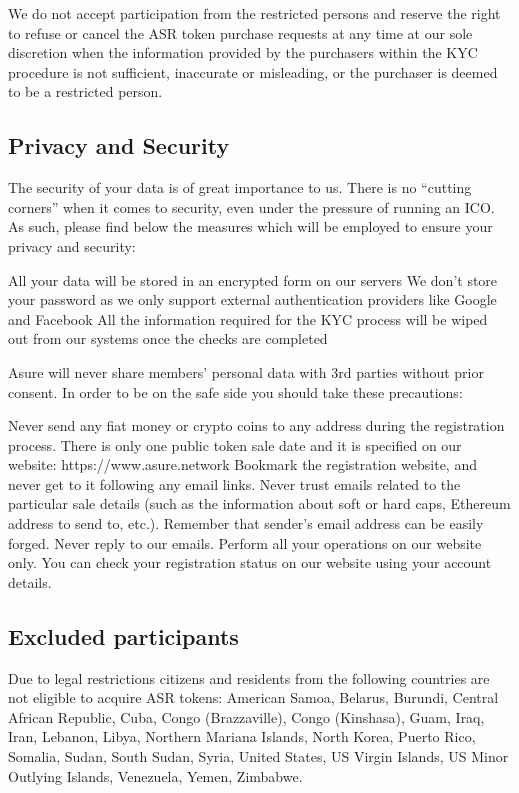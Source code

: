 We do not accept participation from the restricted persons and reserve the right to refuse or cancel the ASR token purchase requests at any time at our sole discretion when the information provided by the purchasers within the KYC procedure is not sufficient, inaccurate or misleading, or the purchaser is deemed to be a restricted person.

\subsection{Privacy and Security}
The security of your data is of great importance to us. There is no “cutting corners” when it comes to security, even under the pressure of running an ICO.  As such, please find below the measures which will be employed to ensure your privacy and security: 

All your data will be stored in an encrypted form on our servers
We don’t store your password as we only support external authentication providers like Google and Facebook
All the information required for the KYC process will be wiped out from our systems once the checks are completed

Asure will never share members’ personal data with 3rd parties without prior consent. In order to be on the safe side you should take these precautions: 

Never send any fiat money or crypto coins to any address during the registration process. There is only one public token sale date and it is specified on our 
website: https://www.asure.network
Bookmark the registration website, and never get to it following any email links.
Never trust emails related to the particular sale details (such as the information about soft or hard caps, Ethereum address to send to, etc.). Remember that sender’s email address can be easily forged. 
Never reply to our emails. Perform all your operations on our website only. You can check your registration status on our website using your account details. 


\subsection{Excluded participants}
Due to legal restrictions citizens and residents from the following countries are not eligible to acquire ASR tokens: American Samoa, Belarus, Burundi, Central African Republic, Cuba, Congo (Brazzaville), Congo (Kinshasa), Guam, Iraq, Iran, Lebanon, Libya, Northern Mariana Islands, North Korea, Puerto Rico, Somalia, Sudan, South Sudan, Syria, United States, US Virgin Islands, US Minor Outlying Islands, Venezuela, Yemen, Zimbabwe.
